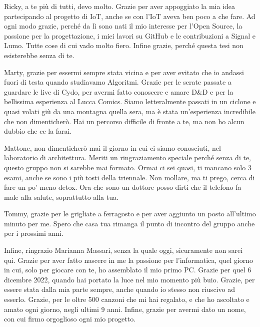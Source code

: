 Ricky, a te più di tutti, devo molto.
Grazie per aver appoggiato la mia idea partecipando al progetto di IoT, anche se con l'IoT aveva ben poco a che fare.
Ad ogni modo grazie, perché da lì sono nati il mio interesse per l'Open Source, la passione per la progettazione, i miei lavori su 
GitHub e le contribuzioni a Signal e Lumo. Tutte cose di cui vado molto fiero. 
Infine grazie, perché questa tesi non esisterebbe senza di te.

Marty, grazie per essermi sempre stata vicina e per aver evitato che io andassi fuori di testa quando studiavamo Algoritmi.
Grazie per le serate passate a guardare le live di Cydo, per avermi fatto conoscere e amare D\&D e per la bellissima esperienza al 
Lucca Comics. Siamo letteralmente passati in un ciclone e quasi volati giù da una montagna quella sera, ma è stata un'esperienza 
incredibile che non dimenticherò. 
Hai un percorso difficile di fronte a te, ma non ho alcun dubbio che ce la farai.

Mattone, non dimenticherò mai il giorno in cui ci siamo conosciuti, nel laboratorio di architettura. Meriti un ringraziamento speciale 
perché senza di te, questo gruppo non si sarebbe mai formato. 
Ormai ci sei quasi, ti mancano solo 3 esami, anche se sono i più tosti della triennale.
Non mollare, ma ti prego, cerca di fare un po' meno detox. 
Ora che sono un dottore posso dirti che il telefono fa male alla salute, soprattutto alla tua.

Tommy, grazie per le grigliate a ferragosto e per aver aggiunto un posto all'ultimo minuto per me. 
Spero che casa tua rimanga il punto di incontro del gruppo anche per i prossimi anni.

\clearpage

Infine, ringrazio Marianna Massari, senza la quale oggi, sicuramente non sarei qui.
Grazie per aver fatto nascere in me la passione per l'informatica, quel giorno in cui, solo per giocare con te, 
ho assemblato il mio primo PC.
Grazie per quel 6 dicembre 2022, quando hai portato la luce nel mio momento più buio.
Grazie, per essere stata dalla mia parte sempre, anche quando io stesso non riuscivo ad esserlo.
Grazie, per le oltre 500 canzoni che mi hai regalato, e che ho ascoltato e amato ogni giorno, negli ultimi 9 anni.
Infine, grazie per avermi dato un nome, con cui firmo orgoglioso ogni mio progetto.